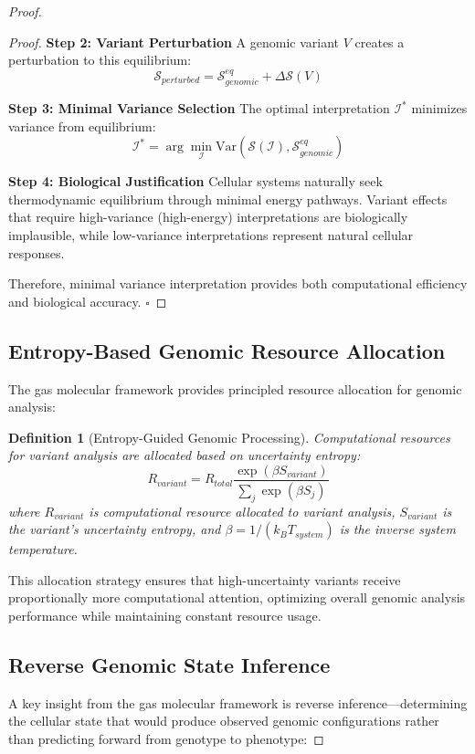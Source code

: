\documentclass[12pt,a4paper]{article}
\newtheorem{definition}[theorem]{Definition}
\begin{document}
\begin{proof}
\begin{proof}
\textbf{Step 2: Variant Perturbation}
A genomic variant $V$ creates a perturbation to this equilibrium:
$$\mathcal{S}_{perturbed} = \mathcal{S}_{genomic}^{eq} + \Delta\mathcal{S}(V)$$

\textbf{Step 3: Minimal Variance Selection}
The optimal interpretation $\mathcal{I}^*$ minimizes variance from equilibrium:
$$\mathcal{I}^* = \arg\min_{\mathcal{I}} \text{Var}(\mathcal{S}(\mathcal{I}), \mathcal{S}_{genomic}^{eq})$$

\textbf{Step 4: Biological Justification}
Cellular systems naturally seek thermodynamic equilibrium through minimal energy pathways. Variant effects that require high-variance (high-energy) interpretations are biologically implausible, while low-variance interpretations represent natural cellular responses.

Therefore, minimal variance interpretation provides both computational efficiency and biological accuracy. $\square$
\end{proof}

\subsection{Entropy-Based Genomic Resource Allocation}

The gas molecular framework provides principled resource allocation for genomic analysis:

\begin{definition}[Entropy-Guided Genomic Processing]
Computational resources for variant analysis are allocated based on uncertainty entropy:
$$R_{variant} = R_{total} \frac{\exp(\beta S_{variant})}{\sum_{j} \exp(\beta S_j)}$$
where $R_{variant}$ is computational resource allocated to variant analysis, $S_{variant}$ is the variant's uncertainty entropy, and $\beta = 1/(k_B T_{system})$ is the inverse system temperature.
\end{definition}

This allocation strategy ensures that high-uncertainty variants receive proportionally more computational attention, optimizing overall genomic analysis performance while maintaining constant resource usage.

\subsection{Reverse Genomic State Inference}

A key insight from the gas molecular framework is reverse inference—determining the cellular state that would produce observed genomic configurations rather than predicting forward from genotype to phenotype:


\end{proof}
\end{document}
